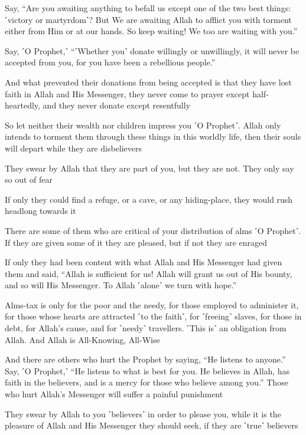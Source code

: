 Say, “Are you awaiting anything to befall us except one of the two best things: ˹victory or martyrdom˺? But We are awaiting Allah to afflict you with torment either from Him or at our hands. So keep waiting! We too are waiting with you.”

Say, ˹O Prophet,˺ “˹Whether you˺ donate willingly or unwillingly, it will never be accepted from you, for you have been a rebellious people.”

And what prevented their donations from being accepted is that they have lost faith in Allah and His Messenger, they never come to prayer except half-heartedly, and they never donate except resentfully

So let neither their wealth nor children impress you ˹O Prophet˺. Allah only intends to torment them through these things in this worldly life, then their souls will depart while they are disbelievers

They swear by Allah that they are part of you, but they are not. They only say so out of fear

If only they could find a refuge, or a cave, or any hiding-place, they would rush headlong towards it

There are some of them who are critical of your distribution of alms ˹O Prophet˺. If they are given some of it they are pleased, but if not they are enraged

If only they had been content with what Allah and His Messenger had given them and said, “Allah is sufficient for us! Allah will grant us out of His bounty, and so will His Messenger. To Allah ˹alone˺ we turn with hope.”

Alms-tax is only for the poor and the needy, for those employed to administer it, for those whose hearts are attracted ˹to the faith˺, for ˹freeing˺ slaves, for those in debt, for Allah’s cause, and for ˹needy˺ travellers. ˹This is˺ an obligation from Allah. And Allah is All-Knowing, All-Wise

And there are others who hurt the Prophet by saying, “He listens to anyone.” Say, ˹O Prophet,˺ “He listens to what is best for you. He believes in Allah, has faith in the believers, and is a mercy for those who believe among you.” Those who hurt Allah’s Messenger will suffer a painful punishment

They swear by Allah to you ˹believers˺ in order to please you, while it is the pleasure of Allah and His Messenger they should seek, if they are ˹true˺ believers

